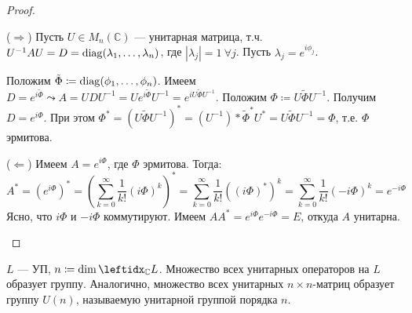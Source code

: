 \begin{proof}
    \begin{proofpart}{($\Rightarrow$)}
        Пусть $U \in M_n(\mathbb{C})$ --- унитарная матрица, т.ч. $U^{-1} AU = D = \operatorname{diag}(\lambda_1, \dots, \lambda_n)$, где $|\lambda_j| = 1\ \forall j$. Пусть $\lambda_j = e^{i\phi_j}$.
        
        Положим $\tilde{\Phi} \coloneqq \operatorname{diag}(\phi_1, \dots, \phi_n)$. Имеем $D = e^{i\tilde{\Phi}} \leadsto A = UDU^{-1} = Ue^{i\tilde{\Phi}}U^{-1} = e^{iU\tilde{\Phi}U^{-1}}$. Положим $\Phi \coloneqq U\tilde{\Phi}U^{-1}$. Получим $D = e^{i\Phi}$. При этом $\Phi^* = (U\tilde{\Phi}U^{-1})^* = (U^{-1})* \tilde{\Phi}^* U^* = U \tilde{\Phi} U^{-1} = \Phi$, т.е. $\Phi$ эрмитова.
    \end{proofpart}

    \begin{proofpart}{($\Leftarrow$)}
        Имеем $A = e^{i\Phi}$, где $\Phi$ эрмитова. Тогда:
        $$A^* = (e^{i\Phi})^* = \left(\sum_{k=0}^\infty \frac{1}{k!} (i\Phi)^k\right)^* = \sum_{k=0}^\infty \frac{1}{k!} \left((i\Phi)^*\right)^k = \sum_{k=0}^\infty \frac{1}{k!} (-i\Phi)^k = e^{-i\Phi}$$
        Ясно, что $i\Phi$ и $-i\Phi$ коммутируют. Имеем $AA^* = e^{i\Phi} e^{-i\Phi} = E$, откуда $A$ унитарна.
    \end{proofpart}
\end{proof}

\begin{defn}
    $L$ --- УП, $n \coloneqq \dim \lsub{\mathbb{C}}{L}$. Множество всех унитарных операторов на $L$ образует группу. Аналогично, множество всех унитарных $n \times n$-матриц образует группу $U(n)$, называемую унитарной группой порядка $n$.
\end{defn}